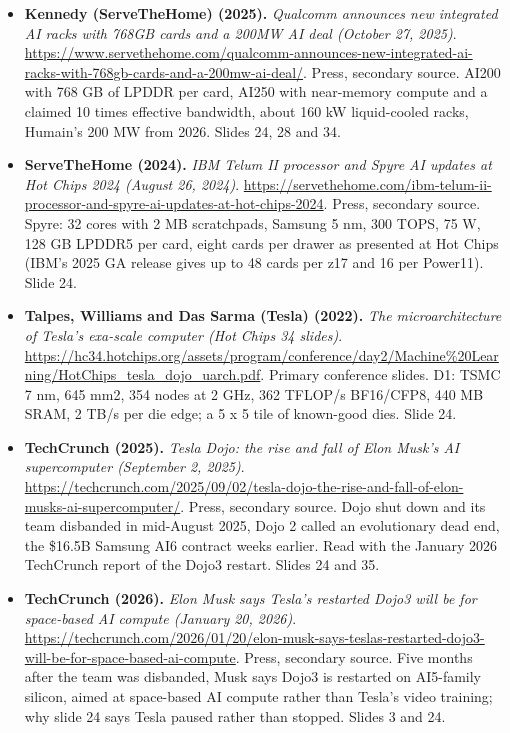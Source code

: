 \begin{itemize}[leftmargin=1.2em,itemsep=3pt]
\item \textbf{Kennedy (ServeTheHome) (2025).} \textit{Qualcomm announces new integrated AI racks with 768GB cards and a 200MW AI deal (October 27, 2025)}. \url{https://www.servethehome.com/qualcomm-announces-new-integrated-ai-racks-with-768gb-cards-and-a-200mw-ai-deal/}. Press, secondary source. AI200 with 768 GB of LPDDR per card, AI250 with near-memory compute and a claimed 10 times effective bandwidth, about 160 kW liquid-cooled racks, Humain's 200 MW from 2026. Slides 24, 28 and 34.
\item \textbf{ServeTheHome (2024).} \textit{IBM Telum II processor and Spyre AI updates at Hot Chips 2024 (August 26, 2024)}. \url{https://servethehome.com/ibm-telum-ii-processor-and-spyre-ai-updates-at-hot-chips-2024}. Press, secondary source. Spyre: 32 cores with 2 MB scratchpads, Samsung 5 nm, 300 TOPS, 75 W, 128 GB LPDDR5 per card, eight cards per drawer as presented at Hot Chips (IBM's 2025 GA release gives up to 48 cards per z17 and 16 per Power11). Slide 24.
\item \textbf{Talpes, Williams and Das Sarma (Tesla) (2022).} \textit{The microarchitecture of Tesla's exa-scale computer (Hot Chips 34 slides)}. \url{https://hc34.hotchips.org/assets/program/conference/day2/Machine%20Learning/HotChips_tesla_dojo_uarch.pdf}. Primary conference slides. D1: TSMC 7 nm, 645 mm2, 354 nodes at 2 GHz, 362 TFLOP/s BF16/CFP8, 440 MB SRAM, 2 TB/s per die edge; a 5 x 5 tile of known-good dies. Slide 24.
\item \textbf{TechCrunch (2025).} \textit{Tesla Dojo: the rise and fall of Elon Musk's AI supercomputer (September 2, 2025)}. \url{https://techcrunch.com/2025/09/02/tesla-dojo-the-rise-and-fall-of-elon-musks-ai-supercomputer/}. Press, secondary source. Dojo shut down and its team disbanded in mid-August 2025, Dojo 2 called an evolutionary dead end, the \$16.5B Samsung AI6 contract weeks earlier. Read with the January 2026 TechCrunch report of the Dojo3 restart. Slides 24 and 35.
\item \textbf{TechCrunch (2026).} \textit{Elon Musk says Tesla's restarted Dojo3 will be for space-based AI compute (January 20, 2026)}. \url{https://techcrunch.com/2026/01/20/elon-musk-says-teslas-restarted-dojo3-will-be-for-space-based-ai-compute}. Press, secondary source. Five months after the team was disbanded, Musk says Dojo3 is restarted on AI5-family silicon, aimed at space-based AI compute rather than Tesla's video training; why slide 24 says Tesla paused rather than stopped. Slides 3 and 24.
\end{itemize}
